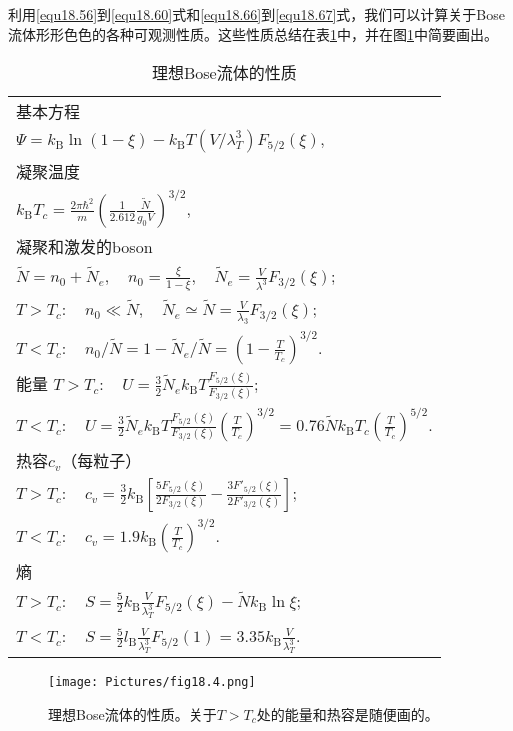 利用\eqref{equ18.56}到\eqref{equ18.60}式和\eqref{equ18.66}到\eqref{equ18.67}式，我们可以计算关于Bose流体形形色色的各种可观测性质。这些性质总结在表\ref{tab18.2}中，并在图\ref{fig18.4}中简要画出。
\begin{table}
\caption{理想Bose流体的性质}
\label{tab18.2}
\begin{tabular}{l}
\toprule
基本方程\\
$\Psi=k_\text{B}\ln(1-\xi)-k_\text{B}T(V/\lambda^3_T)F_{5/2}(\xi),$\\
凝聚温度\\
$k_\text{B}T_c=\frac{2\pi\hbar^2}{m}\left(\frac{1}{2.612}\frac{\tilde N}{g_0V}\right)^{3/2},$\\
凝聚和激发的boson\\
$\tilde N=n_0+\tilde N_e,\quad n_0=\frac{\xi}{1-\xi},\quad \tilde N_e=\frac{V}{\lambda^3}F_{3/2}(\xi)$;\\
$T>T_c:\quad n_0\ll \tilde N,\quad \tilde N_e\simeq \tilde N=\frac{V}{\lambda_3}F_{3/2}(\xi)$;\\
$T<T_c:\quad n_0/\tilde N=1-\tilde N_e/\tilde N=\left(1-\frac{T}{T_c}\right)^{3/2}$.\\
能量
$T>T_c:\quad U=\frac{3}{2}\tilde N_ek_\text{B}T\frac{F_{5/2}(\xi)}{F_{3/2}(\xi)};$\\
$T<T_c:\quad U=\frac{3}{2}\tilde N_ek_\text{B}T\frac{F_{5/2}(\xi)}{F_{3/2}(\xi)}\left(\frac{T}{T_c}\right)^{3/2}=0.76\tilde Nk_\text{B}T_c\left(\frac{T}{T_c}\right)^{5/2}.$\\
热容$c_v$（每粒子）\\
$T>T_c:\quad c_v=\frac{3}{2}k_\text{B}\left[\frac{5F_{5/2}(\xi)}{2F_{3/2}(\xi)}-\frac{3F'_{5/2}(\xi)}{2F'_{3/2}(\xi)}\right]$;\\
$T<T_c:\quad c_v=1.9k_\text{B}\left(\frac{T}{T_c}\right)^{3/2}$.\\
熵\\
$T>T_c:\quad S=\frac{5}{2}k_\text{B}\frac{V}{\lambda_T^3}F_{5/2}(\xi)-\tilde Nk_\text{B}\ln\xi$;\\
$T<T_c:\quad S=\frac{5}{2}l_\text{B}\frac{V}{\lambda_T^3}F_{5/2}(1)=3.35k_\text{B}\frac{V}{\lambda_T^3}$.\\
\bottomrule
\end{tabular}
\end{table}

\begin{figure}
\texttt{[image: Pictures/fig18.4.png]}
\caption{理想Bose流体的性质。关于$T>T_c$处的能量和热容是随便画的。}
\label{fig18.4}
\end{figure}

